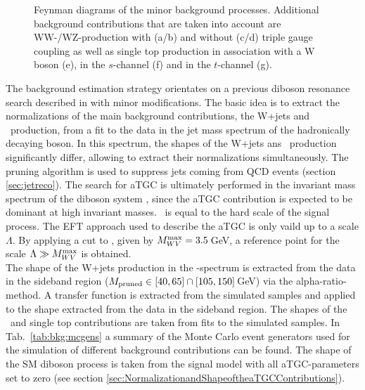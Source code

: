 \begin{figure}[]
	\centering
	\caption[Feynman diagrams of the minor background processes]{Feynman diagrams of the minor background processes. Additional background contributions that are taken into account are WW-/WZ-production with (a/b) and without (c/d) triple gauge coupling as well as single top production in association with a W boson (e), in the $s$-channel (f) and in the $t$-channel (g).}
\end{figure}

\noindent The background estimation strategy orientates on a previous diboson resonance search described in \cite{resonancepas} with minor modifications. The basic idea is to extract the normalizations of the main background contributions, the W+jets and \ttbar \ production, from a fit to the data in the jet mass spectrum of the hadronically decaying boson. In this spectrum, the shapes of the W+jets ans \ttbar \ production significantly differ, allowing to extract their normalizations simultaneously. The pruning algorithm is used to suppress jets coming from QCD events (section \ref{sec:jetreco}). The search for aTGC is ultimately performed in the invariant mass spectrum of the diboson system \MWV , since the aTGC contribution is expected to be dominant at high invariant masses. \MWV \ is equal to the hard scale of the signal process. The EFT approach used to describe the aTGC is only vaild up to a scale $\Lambda$. By applying a cut to \MWV , given by $M_{WV}^{\rm max}=3.5$\,GeV, a reference point for the scale $\Lambda\gg M_{WV}^{\rm max}$ is obtained.\\

The shape of the W+jets production in the \MWV -spectrum is extracted from the data in the sideband region ($M_\mathrm{pruned} \in [40,65] \cap [105,150]$\,GeV) via the alpha-ratio-method. A transfer function is extracted from the simulated samples and applied to the shape extracted from the data in the sideband region. The shapes of the \ttbar \ and single top contributions are taken from fits to the simulated samples. In Tab.~\ref{tab:bkg:mcgens} a summary of the Monte Carlo event generators used for the simulation of different background contributions can be found. The shape of the SM diboson process is taken from the signal model with all aTGC-parameters set to zero (see section \ref{sec:NormalizationandShapeoftheaTGCContributions}).\\

